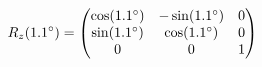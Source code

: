 \documentclass[preview]{standalone}
\begin{document}
\begin{align*}
\special{dvisvgm:raw <g id='unique000'>}R_z(1.1^\circ) = \begin{pmatrix} \cos(1.1^\circ) & -\sin(1.1^\circ) & 0 \\ \sin(1.1^\circ) & \cos(1.1^\circ) & 0 \\ 0 & 0 & 1 \end{pmatrix}\special{dvisvgm:raw </g>}
\end{align*}
\end{document}
